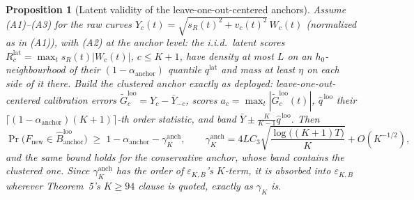 \documentclass[12pt]{article}
\newtheorem{proposition}{Proposition}
\theoremstyle{definition}
\theoremstyle{remark}
\begin{document}
\begin{proposition}[Latent validity of the leave-one-out-centered anchors]
\label{prop:looanchor}
Assume (A1)--(A3) for the raw curves $Y_c(t)=\sqrt{s_R(t)^2+v_c(t)^2}\,W_c(t)$
(normalized as in (A1)), with (A2) at the anchor level: the i.i.d.\ latent
scores $R^{\text{lat}}_c=\max_t s_R(t)|W_c(t)|$, $c\le K{+}1$, have density
at most $L$ on an $h_0$-neighbourhood of their $(1-\alpha_{\text{anchor}})$
quantile $q^{\text{lat}}$ and mass at least $\eta$ on each side of it there.
Build the clustered anchor exactly as deployed: leave-one-out-centered
calibration errors $\widetilde G^{\text{loo}}_c=Y_c-\bar Y_{-c}$, scores
$a_c=\max_t|\widetilde G^{\text{loo}}_c(t)|$, $\widehat q^{\,\text{loo}}$
their $\lceil(1-\alpha_{\text{anchor}})(K{+}1)\rceil$-th order statistic,
and band $\bar Y\pm\tfrac{K}{K-1}\widehat q^{\,\text{loo}}$. Then
\[
\Pr\big(F_{\text{new}}\in\widehat B^{\text{loo}}_{\text{anchor}}\big)\;\ge\;
1-\alpha_{\text{anchor}}-\gamma^{\text{anch}}_K,
\qquad
\gamma^{\text{anch}}_K=4LC_3\sqrt{\frac{\log\big((K{+}1)T\big)}{K}}+O(K^{-1/2}),
\]
and the same bound holds for the conservative anchor, whose band contains
the clustered one. Since $\gamma^{\text{anch}}_K$ has the order of
$\varepsilon_{K,B}$'s $K$-term, it is absorbed into $\varepsilon_{K,B}$
wherever Theorem~5's $K\ge94$ clause is quoted, exactly as $\gamma_K$ is.
\end{proposition}
\end{document}
